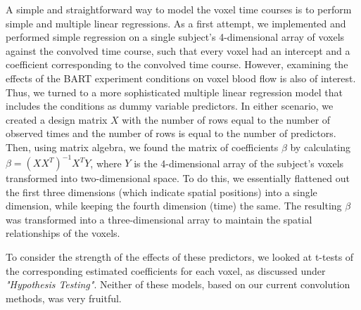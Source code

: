 \par \indent A simple and straightforward way to model the voxel time courses is to perform simple and multiple linear regressions. As a first attempt, we implemented and performed simple regression on a single subject's 4-dimensional array of voxels against the convolved time course, such that every voxel had an intercept and a coefficient corresponding to the convolved time course. However, examining the effects of the BART experiment conditions on voxel blood flow is also of interest. Thus, we turned to a more sophisticated multiple linear regression model that includes the conditions as dummy variable predictors. In either scenario, we created a design matrix $X$ with the number of rows equal to the number of observed times and the number of rows is equal to the number of predictors. Then, using matrix algebra, we found the matrix of coefficients $\beta$ by calculating $\beta = (X X^T)^{-1} X^T Y$, where $Y$ is the 4-dimensional array of the subject's voxels transformed into two-dimensional space. To do this, we essentially flattened out the first three dimensions (which indicate spatial positions) into a single dimension, while keeping the fourth dimension (time) the same. The resulting $\beta$ was transformed into a three-dimensional array to maintain the spatial relationships of the voxels. 

\par To consider the strength of the effects of these predictors, we looked at t-tests of the corresponding estimated coefficients for each voxel, as discussed under \textit{"Hypothesis Testing"}. Neither of these models, based on our current convolution methods, was very fruitful. 

